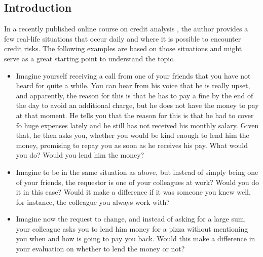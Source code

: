 \documentclass[a4paper,12pt]{article}
\begin{document}
    \subsection[]{Introduction}
            
    In a recently published online course on credit analysis \cite{creditanalysis}, 
    the author provides a few real-life situations that occur daily and where it is possible to encounter credit risks. 
    The following examples are based on those situations and might serve as a great starting point to understand the topic. 
    
    \begin{itemize}
        \item     
        \begin{example}
            Imagine yourself receiving a call from one of your friends that you have not heard for quite a while. 
            You can hear from his voice that he is really upset, and apparently, the reason for this is that 
            he has to pay a fine by the end of the day to avoid an additional charge, but he does not have the money 
            to pay at that moment. He tells you that the reason for this is that he had to cover fo huge expenses lately 
            and he still has not received his monthly salary. Given that, he then asks you, whether you would be kind enough to lend 
            him the money, promising to repay you as soon as he receives his pay. What would you do? Would you lend him the money? 
        \end{example} 
        \item
        \begin{example}
            Imagine to be in the same situation as above, but instead of simply being one of your friends, 
            the requestor is one of your colleagues at work? Would you do it in this case? Would it make a 
            difference if it was someone you knew well, for instance, the colleague you always work with? 
        \end{example}
        \item
        \begin{example}
            Imagine now the request to change, and instead of asking for a large sum, your colleague asks you to lend
            him money for a pizza without mentioning you when and how is going to pay you back. Would this make a difference 
            in your evaluation on whether to lend the money or not?
        \end{example}
    \end{itemize}
 
\end{document}
